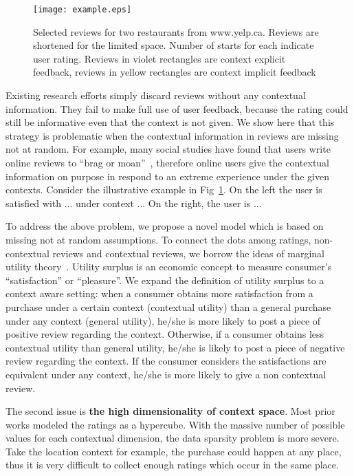 \documentclass{llncs}
\begin{document}
\begin{figure}[!ht]
\label{fig:example}
\centering
\texttt{[image: example.eps]}
\caption{Selected reviews for two restaurants from www.yelp.ca. Reviews are shortened for the limited space. Number of starts for each indicate user rating. Reviews in violet rectangles are context explicit feedback, reviews in yellow rectangles are context implicit feedback}
\end{figure}

Existing research efforts simply discard reviews without any contextual information. They fail to make full use of user feedback, because the rating could still be informative even that the context is not given. We  show here that this strategy is problematic when the contextual information in reviews are missing not at random.  For example, many social studies have found that users write online reviews to ``brag or moan''~\cite{}, therefore online users give the contextual information on purpose in respond to an extreme experience under the given contexts. Consider the illustrative example in Fig~\ref{fig:example}. On the left  the user is satisfied with ... under context ... On the right, the user is ...

To address the above problem, we propose a novel model which is based on missing not at random assumptions. To connect the dots among ratings, non-contextual reviews and contextual reviews, we borrow the ideas of marginal utility theory~\cite{samuelson1937note}. Utility surplus is an economic concept to measure consumer's ``satisfaction'' or ``pleasure''. We expand the definition of utility surplus to a context aware setting: when a consumer obtains more satisfaction from  a purchase under a certain context (contextual utility) than a general purchase under any context (general utility), he/she is more likely to post a piece of positive review regarding the context. Otherwise, if a consumer obtains less contextual utility than general utility, he/she is likely to post a piece of negative review regarding the context. If the consumer considers the satisfactions are equivalent under any context, he/she is more likely to give a non contextual review. 

The second issue is \textbf{the high dimensionality of context space}. Most prior works modeled the ratings as a hypercube. With the massive number of possible values for each contextual dimension, the data sparsity problem is more severe. Take the location context for example, the purchase could happen at any place, thus it is very difficult to collect enough  ratings which occur in the same place. 
\end{document}
